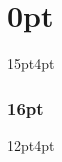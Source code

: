 

% 


% 

\usepackage[left=1in, right=0.5in, top=1in, bottom=0.65in]{geometry}
\usepackage{mathptmx}

\usepackage{titlesec}
\usepackage[scaled=1]{helvet}%
\titlespacing*\section{0pt}{15pt}{4pt}
\titlespacing\subsubsection{16pt}{12pt}{4pt}


